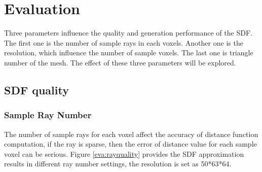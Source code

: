 \clearpage

\section{Evaluation}

Three parameters influence the quality and generation performance of the SDF. The first one is the number of sample rays in each voxels. Another one is the resolution, which influence the number of sample voxels. The last one is triangle number of the mesh. The effect of these three parameters will be explored.

\subsection{SDF quality}
\label{eva:quality}

\subsubsection{Sample Ray Number}

The number of sample rays for each voxel affect the accuracy of distance function computation, if the ray is sparse, then the error of distance value for each sample voxel can be serious. Figure \ref{eva:rayquality} provides the SDF approximation results in different ray number settings, the resolution is set as 50*63*64.


